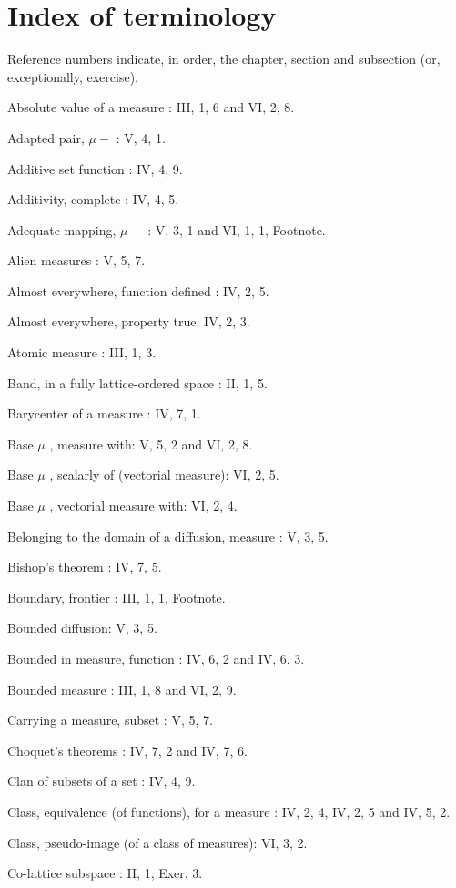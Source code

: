 \chapter*{Index of terminology}
{}

Reference numbers indicate, in order, the chapter, section and subsection (or, exceptionally, exercise).

Absolute value of a measure : III, 1, 6 and VI, 2, 8.

Adapted pair, \(\mu-\) : V, 4, 1.

Additive set function : IV, 4, 9.

Additivity, complete : IV, 4, 5.

Adequate mapping, \(\mu-\) : V, 3, 1 and VI, 1, 1, Footnote.

Alien measures : V, 5, 7.

Almost everywhere, function defined : IV, 2, 5.

Almost everywhere, property true: IV, 2, 3.

Atomic measure : III, 1, 3.

Band, in a fully lattice-ordered space : II, 1, 5.

Barycenter of a measure : IV, 7, 1.

Base \(\mu\) , measure with: V, 5, 2 and VI, 2, 8.

Base \(\mu\) , scalarly of (vectorial measure): VI, 2, 5.

Base \(\mu\) , vectorial measure with: VI, 2, 4.

Belonging to the domain of a diffusion, measure : V, 3, 5.

Bishop's theorem : IV, 7, 5.

Boundary, frontier : III, 1, 1, Footnote.

Bounded diffusion: V, 3, 5.

Bounded in measure, function : IV, 6, 2 and IV, 6, 3.

Bounded measure : III, 1, 8 and VI, 2, 9.

Carrying a measure, subset : V, 5, 7.

Choquet's theorems : IV, 7, 2 and IV, 7, 6.

Clan of subsets of a set : IV, 4, 9.

Class, equivalence (of functions), for a measure : IV, 2, 4, IV, 2, 5 and IV, 5, 2.

Class, pseudo-image (of a class of measures): VI, 3, 2.

Co-lattice subspace : II, 1, Exer. 3.

